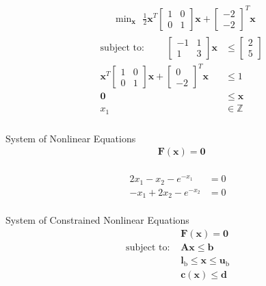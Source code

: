 \documentclass{article}
\begin{document}
\begin{align*}
    &\qquad \text{min}_{\mathbf{x}} \text{ } \frac{1}{2}\mathbf{x}^T \begin{bmatrix} 1 & 0 \\ 0 & 1 \end{bmatrix} \mathbf{x} +
                                        \begin{bmatrix} -2 \\ -2 \end{bmatrix}^T \mathbf{x}\\
    &\begin{aligned}
    \mbox{subject to: } \qquad \begin{bmatrix} -1 & 1 \\ 1 & 3 \end{bmatrix} \mathbf{x} &\le \begin{bmatrix} 2 \\ 5 \end{bmatrix}\\
                        \mathbf{x}^T \begin{bmatrix} 1 & 0 \\ 0 & 1 \end{bmatrix} \mathbf{x} + \begin{bmatrix} 0 \\ -2 \end{bmatrix}^T \mathbf{x}
                        &\le 1\\
                        \mathbf{0} &\le \mathbf{x}\\
                        x_1 &\in \mathbb{Z}\\
    \end{aligned}
\end{align*}

System of Nonlinear Equations
\begin{align*}
     & \mathbf{F} \left( \mathbf{x} \right) = \mathbf{0} \\
\end{align*}

\begin{align*}
    2x_1 - x_2 - e^{-x_1} &= 0\\
    -x_1 + 2x_2 - e^{-x_2} &= 0\\
\end{align*}


System of Constrained Nonlinear Equations
\begin{align*}
                       & \mathbf{F} \left( \mathbf{x} \right) = \mathbf{0} \\
    \mbox{subject to: }& \mathbf{A}\mathbf{x} \le \mathbf{b}\\
                       & \mathbf{l}_{\text{b}} \le \mathbf{x} \le \mathbf{u}_{\text{b}}\\
                       & \mathbf{c}\left(\mathbf{x}\right) \le \mathbf{d}\\
\end{align*}
\end{document}

